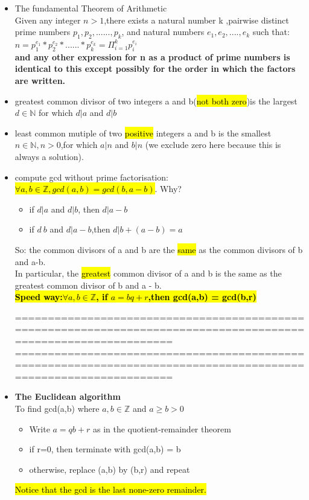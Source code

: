 \documentclass{article}
\begin{document}
\begin{itemize}
\item The fundamental Theorem of Arithmetic\\
Given any integer $n > 1$,there exists a natural number k ,pairwise distinct prime numbers $p_1,p_2,......,p_k$,
and natural numbers $e_1,e_2,....,e_k$ such that:
\textbf{$n = p_1^{e_1} * p_2^{e_2} *......*p_k^{e_k} = \Pi_{i = 1}^k p_i^{e_i}$}\\
\textbf{and any other expression for n as a product of prime numbers is identical to this except possibly for the order in which the factors are written.}

\item greatest common divisor of two integers a and b(\hl{not both zero})is the largest $d \in \mathbb{N}$ for which $d | a$ and $d | b$

\item least  common mutiple of two \hl{positive} integers a and b is the smallest $n \in \mathbb{N},n > 0$,for which $a | n$ and $b | n$ (we exclude zero here because this is always a solution).

\item compute gcd without prime factorisation:\\
\hl{$\forall a,b \in \mathbb{Z},gcd(a,b) = gcd(b,a-b)$}.
Why?
\begin{itemize}
\item if $d | a$ and $d | b$, then $d | a-b$
\item if $d \ b$ and $d | a-b$,then $d | b + (a - b) = a$
\end{itemize}

So: the common divisors of a and b are the \hl{same} as the common divisors of  b and a-b.\\
In particular, the \hl{greatest} common divisor of a and b is the same as the greatest common divisor of b and a - b.\\
\hl{\textbf{Speed way:$\forall a,b \in \mathbb{Z}$, if $a = bq + r$,then gcd(a,b) = gcd(b,r)}}

================================================================================================================
\newpage
================================================================================================================

\item \textbf{The Euclidean algorithm}\\
To find gcd(a,b) where $a,b \in \mathbb{Z}$ and $ a \geq b > 0$
\begin{itemize}
\item Write $a = qb + r$ as in the quotient-remainder theorem
\item if r=0, then terminate with gcd(a,b) = b
\item otherwise, replace (a,b) by (b,r) and repeat
\end{itemize}
\hl{Notice that the gcd is the last none-zero remainder.}\\


\end{itemize}
\end{document}
